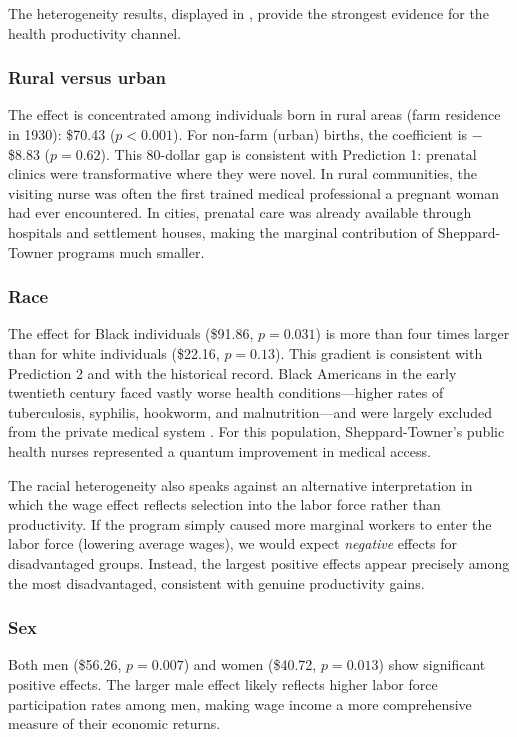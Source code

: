 \documentclass[12pt]{article}
\begin{document}
The heterogeneity results, displayed in , provide the strongest evidence for the health productivity channel.

\subsubsection*{Rural versus urban} The effect is concentrated among individuals born in rural areas (farm residence in 1930): \$70.43 ($p < 0.001$). For non-farm (urban) births, the coefficient is $-$\$8.83 ($p = 0.62$). This 80-dollar gap is consistent with Prediction 1: prenatal clinics were transformative where they were novel. In rural communities, the visiting nurse was often the first trained medical professional a pregnant woman had ever encountered. In cities, prenatal care was already available through hospitals and settlement houses, making the marginal contribution of Sheppard-Towner programs much smaller.

\subsubsection*{Race} The effect for Black individuals (\$91.86, $p = 0.031$) is more than four times larger than for white individuals (\$22.16, $p = 0.13$). This gradient is consistent with Prediction 2 and with the historical record. Black Americans in the early twentieth century faced vastly worse health conditions---higher rates of tuberculosis, syphilis, hookworm, and malnutrition---and were largely excluded from the private medical system \citep{feigenberg2015, cutlermiller2005}. For this population, Sheppard-Towner's public health nurses represented a quantum improvement in medical access.

The racial heterogeneity also speaks against an alternative interpretation in which the wage effect reflects selection into the labor force rather than productivity. If the program simply caused more marginal workers to enter the labor force (lowering average wages), we would expect \textit{negative} effects for disadvantaged groups. Instead, the largest positive effects appear precisely among the most disadvantaged, consistent with genuine productivity gains.

\subsubsection*{Sex} Both men (\$56.26, $p = 0.007$) and women (\$40.72, $p = 0.013$) show significant positive effects. The larger male effect likely reflects higher labor force participation rates among men, making wage income a more comprehensive measure of their economic returns.
\end{document}
